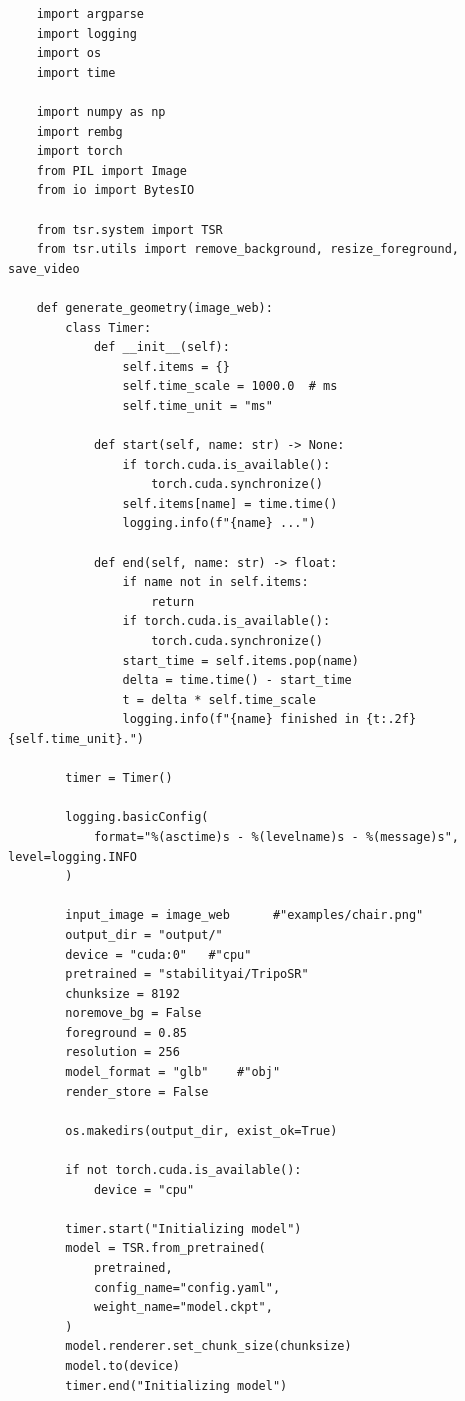 \captionsetup{type=listing}
\label{lst:runAPI3d}
\begin{verbatim}
    import argparse
    import logging
    import os
    import time
    
    import numpy as np
    import rembg
    import torch
    from PIL import Image
    from io import BytesIO
    
    from tsr.system import TSR
    from tsr.utils import remove_background, resize_foreground, save_video
    
    def generate_geometry(image_web):
        class Timer:
            def __init__(self):
                self.items = {}
                self.time_scale = 1000.0  # ms
                self.time_unit = "ms"
    
            def start(self, name: str) -> None:
                if torch.cuda.is_available():
                    torch.cuda.synchronize()
                self.items[name] = time.time()
                logging.info(f"{name} ...")
    
            def end(self, name: str) -> float:
                if name not in self.items:
                    return
                if torch.cuda.is_available():
                    torch.cuda.synchronize()
                start_time = self.items.pop(name)
                delta = time.time() - start_time
                t = delta * self.time_scale
                logging.info(f"{name} finished in {t:.2f}{self.time_unit}.")
    
        timer = Timer()
    
        logging.basicConfig(
            format="%(asctime)s - %(levelname)s - %(message)s", level=logging.INFO
        )
    
        input_image = image_web      #"examples/chair.png"
        output_dir = "output/"
        device = "cuda:0"   #"cpu"
        pretrained = "stabilityai/TripoSR"
        chunksize = 8192
        noremove_bg = False
        foreground = 0.85
        resolution = 256
        model_format = "glb"    #"obj"
        render_store = False
    
        os.makedirs(output_dir, exist_ok=True)
    
        if not torch.cuda.is_available():
            device = "cpu"
    
        timer.start("Initializing model")
        model = TSR.from_pretrained(
            pretrained,
            config_name="config.yaml",
            weight_name="model.ckpt",
        )
        model.renderer.set_chunk_size(chunksize)
        model.to(device)
        timer.end("Initializing model")
    

\end{verbatim}
